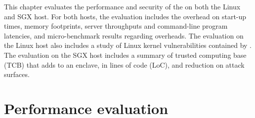 This chapter evaluates the performance and security of the \graphene{} \libos{} on both the Linux and SGX host.
For both hosts,
the evaluation includes the overhead on start-up times, memory footprints, server throughputs and command-line program latencies, and micro-benchmark results regarding \linuxapi{} overheads.
The evaluation on the Linux host also includes a study of Linux kernel vulnerabilities contained by \graphene{}.
The evaluation on the SGX host includes a summary of trusted computing base (TCB) that \graphenesgx{} adds to an enclave, in lines of code (LoC), and reduction on attack surfaces.











\section{Performance evaluation}
\label{sec:eval:perf}





